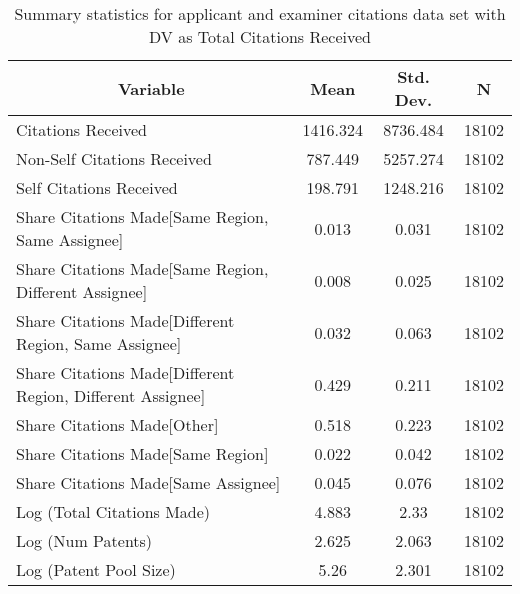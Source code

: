 
\begin{table}[htbp]\centering \caption{Summary statistics for applicant and examiner citations data set with DV as Total Citations Received \label{ae.tsummary}}
\scriptsize
\singlespacing
\begin{tabular}{l c c  c}\hline\hline
\multicolumn{1}{c}{\textbf{Variable}} & \textbf{Mean}
 & \textbf{Std. Dev.} & \textbf{N}\\ \hline
Citations Received & 1416.324 & 8736.484  & 18102\\
Non-Self Citations Received & 787.449 & 5257.274  & 18102\\
Self Citations Received & 198.791 & 1248.216  & 18102\\
Share Citations Made[Same Region, Same Assignee] & 0.013 & 0.031  & 18102\\
Share Citations Made[Same Region, Different Assignee] & 0.008 & 0.025  & 18102\\
Share Citations Made[Different Region, Same Assignee] & 0.032 & 0.063  & 18102\\
Share Citations Made[Different Region, Different Assignee] & 0.429 & 0.211  & 18102\\
Share Citations Made[Other] & 0.518 & 0.223  & 18102\\
Share Citations Made[Same Region] & 0.022 & 0.042  & 18102\\
Share Citations Made[Same Assignee] & 0.045 & 0.076  & 18102\\
Log (Total Citations Made) & 4.883 & 2.33  & 18102\\
Log (Num Patents) & 2.625 & 2.063  & 18102\\
Log (Patent Pool Size) & 5.26 & 2.301  & 18102\\
\hline\end{tabular}
\end{table}
